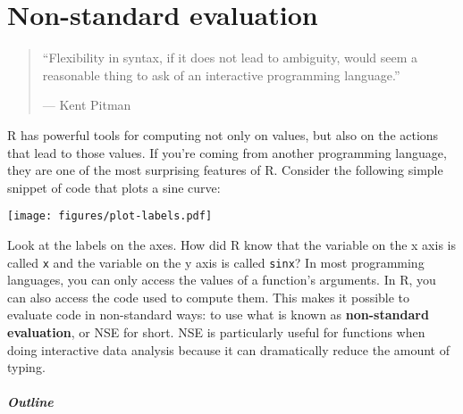 \chapter{Non-standard evaluation}\label{nse}

\begin{quote}
``Flexibility in syntax, if it does not lead to ambiguity, would seem a
reasonable thing to ask of an interactive programming language.''

--- Kent Pitman
\end{quote}

R has powerful tools for computing not only on values, but also on the
actions that lead to those values. If you're coming from another
programming language, they are one of the most surprising features of R.
Consider the following simple snippet of code that plots a sine curve:

\begin{Shaded}
\begin{Highlighting}[]
\StringTok{ }\NormalTok{(}\NormalTok{, } \NormalTok{*}\StringTok{ } \NormalTok{)}
\StringTok{ }
 \NormalTok{)}
\end{Highlighting}
\end{Shaded}

\texttt{[image: figures/plot-labels.pdf]}

Look at the labels on the axes. How did R know that the variable on the
x axis is called \texttt{x} and the variable on the y axis is called
\texttt{sinx}? In most programming languages, you can only access the
values of a function's arguments. In R, you can also access the code
used to compute them. This makes it possible to evaluate code in
non-standard ways: to use what is known as \textbf{non-standard
evaluation}, or NSE for short. NSE is particularly useful for functions
when doing interactive data analysis because it can dramatically reduce
the amount of typing. 

\paragraph{Outline}

